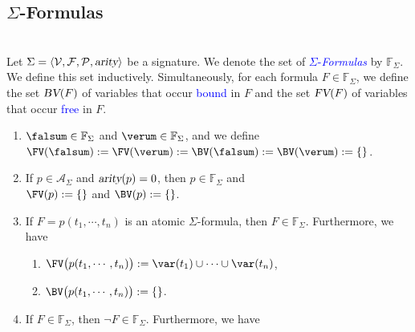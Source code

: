 \subsection{$\Sigma$-Formulas}
\begin{Definition}
\label{predicate-formula} \hspace*{\fill}
  \\
Let $\Sigma = \langle \mathcal{V}, \mathcal{F}, \mathcal{P}, \textsl{arity} \rangle$ be a signature.
    We denote the set of \textcolor{blue}{$\Sigma$-\emph{Formulas}} by $\mathbb{F}_\Sigma$.
    We define this set inductively.
    Simultaneously, for each formula $F \in \mathbb{F}_\Sigma$, we define the set $\textsl{BV}(F)$ of variables
    that occur \textcolor{blue}{bound} in $F$ and the set $\textsl{FV}(F)$ of variables that occur
    \textcolor{blue}{free} in $F$. 
    \begin{enumerate}
    \item $\falsum \in \mathbb{F}_\Sigma$ and $\verum \in \mathbb{F}_\Sigma$, and we define \\[0.2cm]
          \hspace*{1.3cm} $\FV(\falsum) := \FV(\verum) := \BV(\falsum) := \BV(\verum) := \{\}$.
    \item If $p \in \mathcal{A}_\Sigma$ and $\textsl{arity}(p)= 0$, then $p \in \mathbb{F}_\Sigma$ and    
          \\[0.2cm]
          \hspace*{1.3cm}
          \hspace*{1.3cm} $\FV(p) := \{\}$ \quad and \quad $\BV(p) := \{\}$.
    \item If $F = p(t_1,\cdots,t_n)$ is an atomic $\Sigma$-formula, then $F \in \mathbb{F}_\Sigma$.
          Furthermore, we have
          \begin{enumerate}
          \item $\FV\bigl(p(t_1,\cdots,t_n) \bigr) := \var(t_1) \cup \cdots \cup \var(t_n)$,
          \item $\BV\bigl(p(t_1,\cdots,t_n) \bigr) := \{\}$.
          \end{enumerate}
    \item If $F \in \mathbb{F}_\Sigma$, then $\neg F \in \mathbb{F}_\Sigma$.  Furthermore, we have
          \begin{enumerate}

\end{enumerate}
\end{enumerate}
\end{Definition}
